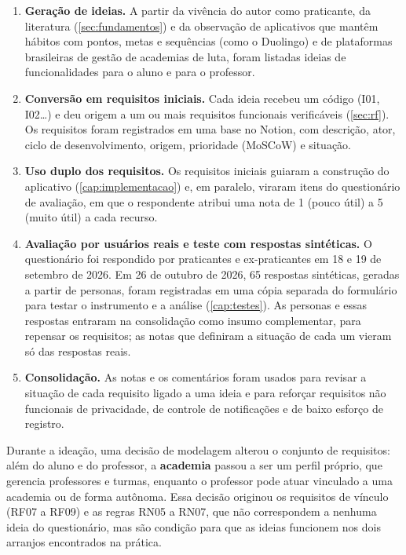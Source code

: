 \begin{enumerate}
  \item \textbf{Geração de ideias.} A partir da vivência do autor como
        praticante, da literatura
        (\autoref{sec:fundamentos}) e da observação de aplicativos que
        mantêm hábitos com pontos, metas e sequências (como o Duolingo) e
        de plataformas brasileiras de gestão de academias de luta, foram
        listadas ideias de funcionalidades para o aluno e para o
        professor.
  \item \textbf{Conversão em requisitos iniciais.} Cada ideia recebeu um
        código (I01, I02\ldots) e deu origem a um ou mais requisitos
        funcionais verificáveis (\autoref{sec:rf}). Os requisitos foram
        registrados em uma base no Notion, com descrição, ator, ciclo de
        desenvolvimento, origem, prioridade (MoSCoW) e situação.
  \item \textbf{Uso duplo dos requisitos.} Os requisitos iniciais
        guiaram a construção do aplicativo (\autoref{cap:implementacao}) e,
        em paralelo, viraram itens do questionário de avaliação, em que o
        respondente atribui uma nota de 1 (pouco útil) a 5 (muito útil) a
        cada recurso.
  \item \textbf{Avaliação por usuários reais e teste com respostas
        sintéticas.} O questionário foi respondido por praticantes e
        ex-praticantes em 18 e 19 de setembro de 2026. Em 26 de outubro
        de 2026, 65 respostas sintéticas, geradas a partir de personas,
        foram registradas em uma cópia separada do formulário para testar
        o instrumento e a análise (\autoref{cap:testes}). As personas e
        essas respostas entraram na consolidação como insumo
        complementar, para repensar os requisitos; as notas que definiram
        a situação de cada um vieram só das respostas reais.
  \item \textbf{Consolidação.} As notas e os comentários foram usados
        para revisar a situação de cada requisito ligado a uma ideia e
        para reforçar requisitos não funcionais de privacidade, de
        controle de notificações e de baixo esforço de registro.
\end{enumerate}

Durante a ideação, uma decisão de modelagem alterou o conjunto de
requisitos: além do aluno e do professor, a \textbf{academia} passou a ser
um perfil próprio, que gerencia professores e turmas, enquanto o professor
pode atuar vinculado a uma academia ou de forma autônoma. Essa decisão
originou os requisitos de vínculo (RF07 a RF09) e as regras RN05 a RN07,
que não correspondem a nenhuma ideia do questionário, mas são condição
para que as ideias funcionem nos dois arranjos encontrados na prática.

